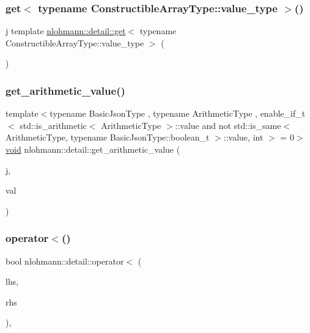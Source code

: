 \subsubsection{\texorpdfstring{get$<$ typename ConstructibleArrayType::value\_type $>$()}{get< typename ConstructibleArrayType::value\_type >()}}
{\footnotesize\ttfamily j template \mbox{\hyperlink{namespacenlohmann_1_1detail_acc422c11342b31368f610b6f96fcedc6}{nlohmann\+::detail\+::get}}$<$ typename Constructible\+Array\+Type\+::value\+\_\+type $>$ (\begin{DoxyParamCaption}{ }\end{DoxyParamCaption})}

\mbox{\label{namespacenlohmann_1_1detail_a85955b9c6dd31846e4b8e891f78614b6}} 
\subsubsection{\texorpdfstring{get\_arithmetic\_value()}{get\_arithmetic\_value()}}
{\footnotesize\ttfamily template$<$typename Basic\+Json\+Type , typename Arithmetic\+Type , enable\+\_\+if\+\_\+t$<$ std\+::is\+\_\+arithmetic$<$ Arithmetic\+Type $>$\+::value and not std\+::is\+\_\+same$<$ Arithmetic\+Type, typename Basic\+Json\+Type\+::boolean\+\_\+t $>$\+::value, int $>$  = 0$>$ \\
\mbox{\hyperlink{namespacenlohmann_1_1detail_a59fca69799f6b9e366710cb9043aa77d}{void}} nlohmann\+::detail\+::get\+\_\+arithmetic\+\_\+value (\begin{DoxyParamCaption}\item[{const Basic\+Json\+Type \&}]{j,  }\item[{Arithmetic\+Type \&}]{val }\end{DoxyParamCaption})}

\mbox{\label{namespacenlohmann_1_1detail_a09169efff3bd1771fff29bd92cea19e0}} 
\subsubsection{\texorpdfstring{operator$<$()}{operator<()}}
{\footnotesize\ttfamily bool nlohmann\+::detail\+::operator$<$ (\begin{DoxyParamCaption}\item[{const \mbox{\hyperlink{namespacenlohmann_1_1detail_a1ed8fc6239da25abcaf681d30ace4985}{value\+\_\+t}}}]{lhs,  }\item[{const \mbox{\hyperlink{namespacenlohmann_1_1detail_a1ed8fc6239da25abcaf681d30ace4985}{value\+\_\+t}}}]{rhs }\end{DoxyParamCaption})\hspace{0.3cm}{\ttfamily [inline]}, {\ttfamily [noexcept]}}



